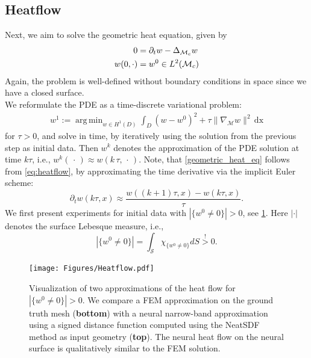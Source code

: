 \documentclass[draft,12pt,openany]{book}
\theoremstyle{plainnormal}
\theoremstyle{remark}
\DeclareMathOperator*{\argmin}{arg\,min}
\begin{document}
\subsection{Heatflow}\label{section_heatflow}
Next, we aim to solve the geometric heat equation, given by
\begin{align}\label{eq:heatflow}
    0 &= \partial_t w - \Delta_{\mathcal{M}_c} w \\
    w(0,\cdot) &= w^0 \in L^2(\mathcal{M}_c)  \notag
\end{align}
Again, the problem is well-defined without boundary conditions in space since we have a closed surface.\\
We reformulate the PDE as a time-discrete variational problem:
\begin{align}\label{geometric_heat_eq}
    w^{1} := \argmin_{w\in H^1(D)}\int_D (w - w^0)^2 + \tau \|\nabla_{\mathcal{M}}w\|^2 \,\mathrm{dx}
\end{align} for $\tau > 0 $, and solve in time, by iteratively using the solution from the previous step as initial data. Then $w^k$ denotes the approximation of the PDE solution at time $k\tau$, i.e., $w^k(\,\cdot\,) \approx w(k\,\tau, \,\cdot\,)$. Note, that \cref{geometric_heat_eq} follows from \cref{eq:heatflow}, by approximating the time derivative via the implicit Euler scheme:  $$\partial_t w(k\tau, x) \approx \frac{w((k+1)\tau, x) - w(k\tau, x)}{\tau}. $$
We first present experiments for initial data with $|\{w^0 \neq0\}| >0$, see \cref{comp_beethoven}. Here $|\cdot|$ denotes the surface Lebesque measure, i.e., $$|\{w^0 \neq0\}| = \int_\mathcal{S} \chi_{\{w^0 \neq 0\}} dS \overset{!}{>} 0.$$
\begin{figure}
    \centering    
    \texttt{[image: Figures/Heatflow.pdf]}
\caption{Visualization of two approximations of the heat flow for $|\{w^0 \neq0\}| >0$. We compare a FEM approximation on the ground truth mesh (\textbf{bottom}) with a neural narrow-band approximation using a signed distance function computed using the NeatSDF method as input geometry (\textbf{top}). The neural heat flow on the neural surface is qualitatively similar to the FEM solution.}\label{comp_beethoven}
\end{figure}
\end{document}
